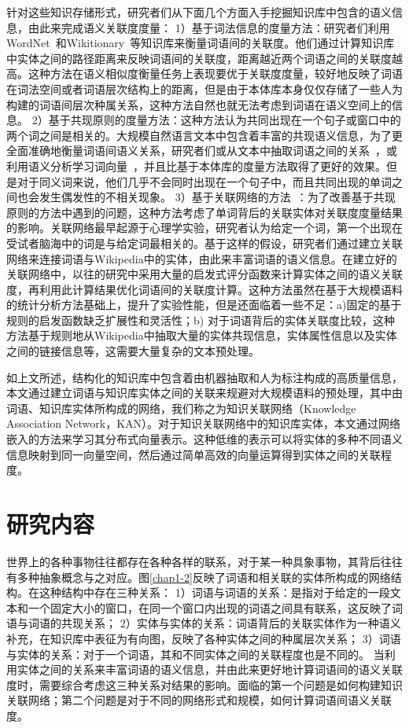 针对这些知识存储形式，研究者们从下面几个方面入手挖掘知识库中包含的语义信息，由此来完成语义关联度度量：
%
1）基于词法信息的度量方法：研究者们利用WordNet~\cite{acl/Pucher07, tkde/ZhuI17}和Wikitionary~\cite{aaai/ZeschMG08}等知识库来衡量词语间的关联度。他们通过计算知识库中实体之间的路径距离来反映词语间的关联度，距离越近两个词语之间的关联度越高。这种方法在语义相似度衡量任务上表现要优于关联度度量，较好地反映了词语在词法空间或者词语层次结构上的距离，但是由于本体库本身仅仅存储了一些人为构建的词语间层次种属关系，这种方法自然也就无法考虑到词语在语义空间上的信息。
%
2）基于共现原则的度量方法：这种方法认为共同出现在一个句子或窗口中的两个词之间是相关的。大规模自然语言文本中包含着丰富的共现语义信息，为了更全面准确地衡量词语间语义关系，研究者们或从文本中抽取词语之间的关系~\cite{aaai/Milne08}，或利用语义分析学习词向量~\cite{ijcai/GabrilovichM07, corr/Mikolov13, emnlp/PenningtonSM14}，并且比基于本体库的度量方法取得了更好的效果。但是对于同义词来说，他们几乎不会同时出现在一个句子中，而且共同出现的单词之间也会发生偶发性的不相关现象。
%
3）基于关联网络的方法~\cite{aaai/ZhangZH15, aaai/GongXH18}：为了改善基于共现原则的方法中遇到的问题，这种方法考虑了单词背后的关联实体对关联度度量结果的影响。关联网络最早起源于心理学实验，研究者认为给定一个词，第一个出现在受试者脑海中的词是与给定词最相关的。基于这样的假设，研究者们通过建立关联网络来连接词语与Wikipedia中的实体，由此来丰富词语的语义信息。在建立好的关联网络中，以往的研究中采用大量的启发式评分函数来计算实体之间的语义关联度，再利用此计算结果优化词语间的关联度计算。这种方法虽然在基于大规模语料的统计分析方法基础上，提升了实验性能，但是还面临着一些不足：a)固定的基于规则的启发函数缺乏扩展性和灵活性；b) 对于词语背后的实体关联度比较，这种方法基于规则地从Wikipedia中抽取大量的实体共现信息，实体属性信息以及实体之间的链接信息等，这需要大量复杂的文本预处理。

如上文所述，结构化的知识库中包含着由机器抽取和人为标注构成的高质量信息，本文通过建立词语与知识库实体之间的关联来规避对大规模语料的预处理，其中由词语、知识库实体所构成的网络，我们称之为知识关联网络（Knowledge Association Network，KAN）。对于知识关联网络中的知识库实体，本文通过网络嵌入的方法来学习其分布式向量表示。这种低维的表示可以将实体的多种不同语义信息映射到同一向量空间，然后通过简单高效的向量运算得到实体之间的关联程度。


\section{研究内容}
世界上的各种事物往往都存在各种各样的联系，对于某一种具象事物，其背后往往有多种抽象概念与之对应。图\ref{chap1-2}反映了词语和相关联的实体所构成的网络结构。在这种结构中存在三种关系：
%
1）词语与词语的关系：是指对于给定的一段文本和一个固定大小的窗口，在同一个窗口内出现的词语之间具有联系，这反映了词语与词语的共现关系；
2）实体与实体的关系：词语背后的关联实体作为一种语义补充，在知识库中表征为有向图，反映了各种实体之间的种属层次关系；
3）词语与实体的关系：对于一个词语，其和不同实体之间的关联程度也是不同的。
%
当利用实体之间的关系来丰富词语的语义信息，并由此来更好地计算词语间的语义关联度时，需要综合考虑这三种关系对结果的影响。面临的第一个问题是如何构建知识关联网络；第二个问题是对于不同的网络形式和规模，如何计算词语间语义关联度。

